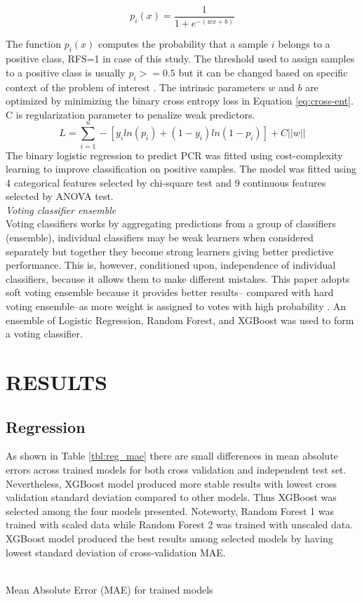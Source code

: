 \documentclass{article}
\begin{document}
\begin{equation}
	\label{eq:logistic}
	p_i(x) = \frac{1}{1+e^{-(wx+b)}}
\end{equation}

The function $p_i(x)$ computes the probability that a sample $i$ belongs to a positive class, RFS=1 in case of this study. The threshold used to assign samples to a positive class is usually $p_i>=0.5$ but it can be changed based on specific context of the problem of interest \cite{vemuri2020hundred}. The intrinsic parameters $w$ and $b$ are optimized by minimizing the binary cross entropy loss in Equation \ref{eq:cross-ent}. C is regularization parameter to penalize weak predictors.
\begin{equation}
	\label{eq:cross-ent}
	L = \sum_{i=1}^{n}-[y_iln(p_i)+(1-y_i)ln(1-p_i)]+C||w||
\end{equation} 
The binary logistic regression to predict PCR was fitted using cost-complexity learning to improve classification on positive samples. The model was fitted using 4 categorical features selected by chi-square test and 9 continuous features selected by ANOVA test.\\

\noindent\textit{Voting classifier ensemble}\\
Voting classifiers works by aggregating predictions from a group of classifiers (ensemble), individual classifiers may be weak learners when considered separately but together they become strong learners giving better predictive performance. This is, however, conditioned upon, independence of individual classifiers, because it allows them to make different mistakes. This paper adopts soft voting ensemble because it provides better results-- compared with hard voting ensemble--as more weight is assigned to votes with high probability \cite{geron2022hands}. An ensemble of Logistic Regression, Random Forest, and XGBoost was used to form a voting classifier.

\section{RESULTS}
\subsection{Regression}
As shown in Table \ref{tbl:reg_mae} there are small differences in mean absolute errors across trained models for both cross validation and independent test set. Nevertheless, XGBoost model produced more stable results with lowest cross validation standard deviation compared to other models. Thus XGBoost was selected among the four models presented. Noteworty, Random Forest 1 was trained with scaled data while Random Forest 2 was trained with unscaled data. 
XGBoost model produced the best results among selected models by having lowest standard deviation of cross-validation MAE.
\label{sec:results}
\begin{table}[h]
	\label{tbl:reg_mae}
	\\
	\caption{Mean Absolute Error (MAE) for trained models}
\end{table}
 
\end{document}

